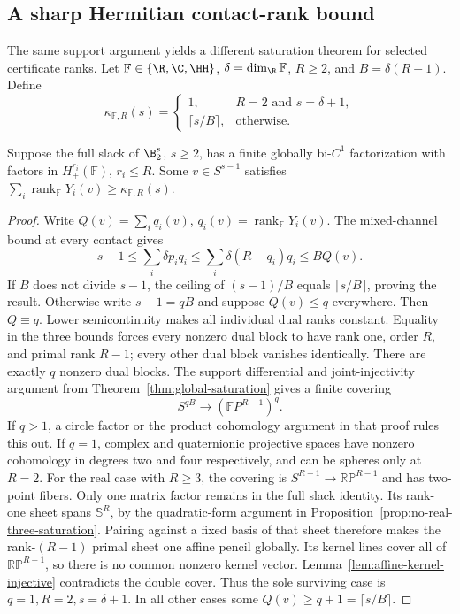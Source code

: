 \subsection{A sharp Hermitian contact-rank bound}
The same support argument yields a different saturation theorem for
selected certificate ranks. Let $\mathbb F\in\{\R,\C,\HH\}$,
$\delta=\dim_\R\mathbb F$, $R\geq2$, and $B=\delta(R-1)$. Define
\[
 \kappa_{\mathbb F,R}(s)=
 \begin{cases}
 1,&R=2\text{ and }s=\delta+1,\\
 \lceil s/B\rceil,&\text{otherwise}.
 \end{cases}
\]
\begin{proposition}\label{prop:hermitian-contact-rank}
Suppose the full slack of $\B_2^s$, $s\geq2$, has a finite globally
bi-$C^1$ factorization with factors in $H_+^{r_i}(\mathbb F)$,
$r_i\leq R$. Some $v\in S^{s-1}$ satisfies
$\sum_i\operatorname{rank}_{\mathbb F}Y_i(v)
\geq\kappa_{\mathbb F,R}(s)$.
\end{proposition}
\begin{proof}
Write $Q(v)=\sum_i q_i(v)$, $q_i(v)=\operatorname{rank}_{\mathbb F}Y_i(v)$.
The mixed-channel bound at every contact gives
\[
 s-1\leq\sum_i\delta p_iq_i
 \leq\sum_i\delta(R-q_i)q_i\leq BQ(v).
\]
If $B$ does not divide $s-1$, the ceiling of $(s-1)/B$ equals
$\lceil s/B\rceil$, proving the result. Otherwise write $s-1=qB$ and
suppose $Q(v)\leq q$ everywhere. Then $Q\equiv q$. Lower
semicontinuity makes all individual dual ranks constant. Equality in the
three bounds forces every nonzero dual block to have rank one, order
$R$, and primal rank $R-1$; every other dual block vanishes identically.
There are exactly $q$ nonzero dual blocks. The support differential and
joint-injectivity argument from Theorem~\ref{thm:global-saturation} gives
a finite covering
\[
 S^{qB}\longrightarrow(\mathbb F P^{R-1})^q.
\]
If $q>1$, a circle factor or the product cohomology argument in that proof
rules this out. If $q=1$, complex and quaternionic projective spaces have
nonzero cohomology in degrees two and four respectively, and can be
spheres only at $R=2$. For the real case with $R\geq3$, the covering is
$S^{R-1}\to\mathbb{RP}^{R-1}$ and has two-point fibers.
Only one matrix factor remains in the full slack identity. Its rank-one
sheet spans $\mathbb S^R$, by the quadratic-form argument in
Proposition~\ref{prop:no-real-three-saturation}. Pairing against a fixed
basis of that sheet therefore makes the rank-$(R-1)$ primal sheet one
affine pencil globally. Its kernel lines cover all of
$\mathbb{RP}^{R-1}$, so there is no common nonzero kernel vector.
Lemma~\ref{lem:affine-kernel-injective} contradicts the double cover.
Thus the sole surviving case is $q=1,R=2,s=\delta+1$. In all other cases
some $Q(v)\geq q+1=\lceil s/B\rceil$.
\end{proof}

